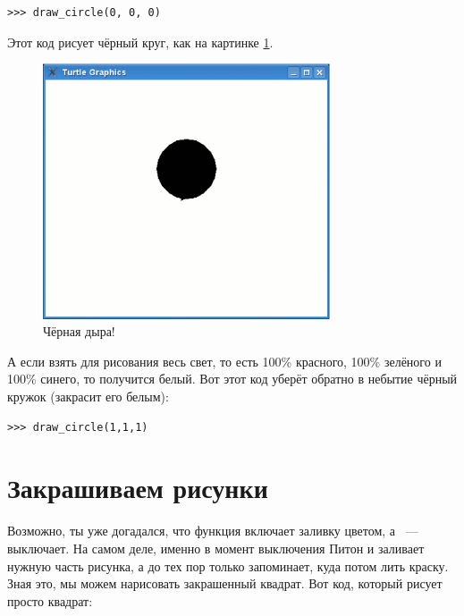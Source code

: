 \begin{listing}
\begin{verbatim}
>>> draw_circle(0, 0, 0)
\end{verbatim}
\end{listing}

Этот код рисует чёрный круг, как на картинке \ref{fig25}.

\begin{figure}
\begin{center}
\includegraphics[width=85mm]{../en/figure25.eps}
\end{center}
\caption{Чёрная дыра!}\label{fig25}
\end{figure}

А если взять для рисования весь свет, то есть 100\% красного, 100\% зелёного и 100\% синего, то получится белый. Вот этот код уберёт обратно в небытие чёрный кружок (закрасит его белым):

\begin{listing}
\begin{verbatim}
>>> draw_circle(1,1,1)
\end{verbatim}
\end{listing}

\section{Закрашиваем рисунки}

Возможно, ты уже догадался, что функция  включает заливку цветом, а  — выключает. На самом деле, именно в момент выключения Питон и заливает нужную часть рисунка, а до тех пор только запоминает, куда потом лить краску. Зная это, мы можем нарисовать закрашенный квадрат. Вот код, который рисует просто квадрат:

